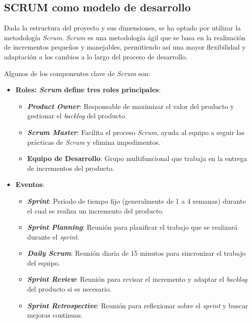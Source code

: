 \subsection{SCRUM como modelo de desarrollo}
Dada la estructura del proyecto y sus dimensiones, se ha optado por utilizar la metodología \textit{Scrum}. \textit{Scrum} es una metodología ágil que se basa en la realización de incrementos pequeños y manejables, permitiendo así una mayor flexibilidad y adaptación a los cambios a lo largo del proceso de desarrollo.

Algunos de los componentes clave de \textit{Scrum} son:
\begin{itemize}

    \item\textbf{Roles: \textit{Scrum} define tres roles principales}:
    \begin{itemize}
 
        \item\textbf{\textit{Product Owner}}: Responsable de maximizar el valor del producto y gestionar el \textit{backlog} del producto.
        \item\textbf{\textit{Scrum Master}}: Facilita el proceso \textit{Scrum}, ayuda al equipo a seguir las prácticas de \textit{Scrum} y elimina impedimentos.
        \item\textbf{Equipo de Desarrollo}: Grupo multifuncional que trabaja en la entrega de incrementos del producto.
          
    \end{itemize}
    \item\textbf{Eventos}:
    \begin{itemize}

        \item\textbf{\textit{Sprint}}: Periodo de tiempo fijo (generalmente de 1 a 4 semanas) durante el cual se realiza un incremento del producto.
        \item\textbf{\textit{Sprint Planning}}: Reunión para planificar el trabajo que se realizará durante el \textit{sprint}.
        \item\textbf{\textit{Daily Scrum}}: Reunión diaria de 15 minutos para sincronizar el trabajo del equipo.
        \item\textbf{\textit{Sprint Review}}: Reunión para revisar el incremento y adaptar el \textit{backlog} del producto si es necesario.
        \item\textbf{\textit{Sprint Retrospective}}: Reunión para reflexionar sobre el \textit{sprint} y buscar mejoras continuas.
           

\end{itemize}
\end{itemize}

